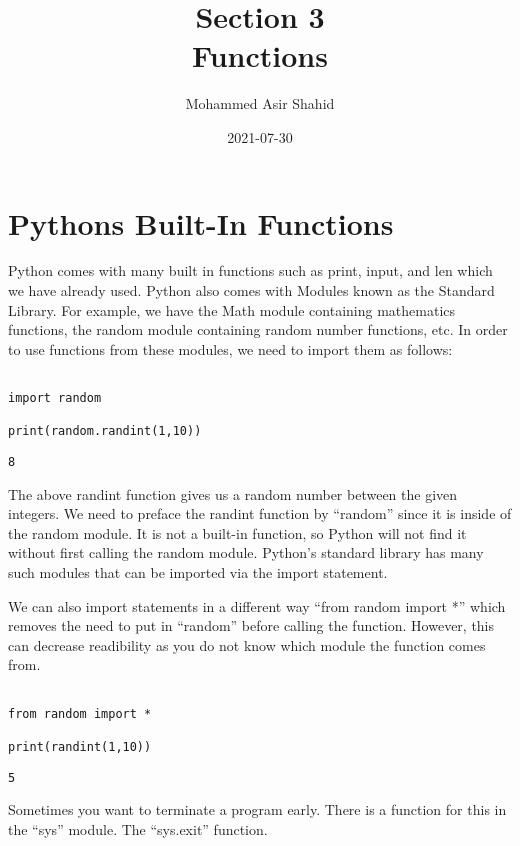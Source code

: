 \documentclass[11pt]{article}
\author{Mohammed Asir Shahid}
\date{2021-07-30}
\title{Section 3\\\medskip
\large Functions}
\begin{document}
\maketitle
\tableofcontents


\section{Pythons Built-In Functions}
\label{sec:org82a9517}

Python comes with many built in functions such as print, input, and len which we have already used. Python also comes with Modules known as the Standard Library. For example, we have the Math module containing mathematics functions, the random module containing random number functions, etc. In order to use functions from these modules, we need to import them as follows:

\begin{verbatim}

import random

print(random.randint(1,10))

\end{verbatim}

\begin{verbatim}
8
\end{verbatim}


The above randint function gives us a random number between the given integers. We need to preface the randint function by ``random'' since it is inside of the random module. It is not a built-in function, so Python will not find it without first calling the random module. Python's standard library has many such modules that can be imported via the import statement.

We can also import statements in a different way ``from random import *'' which removes the need to put in ``random'' before calling the function. However, this can decrease readibility as you do not know which module the function comes from.

\begin{verbatim}

from random import *

print(randint(1,10))

\end{verbatim}

\begin{verbatim}
5
\end{verbatim}


Sometimes you want to terminate a program early. There is a function for this in the ``sys'' module. The ``sys.exit'' function.
\end{document}
